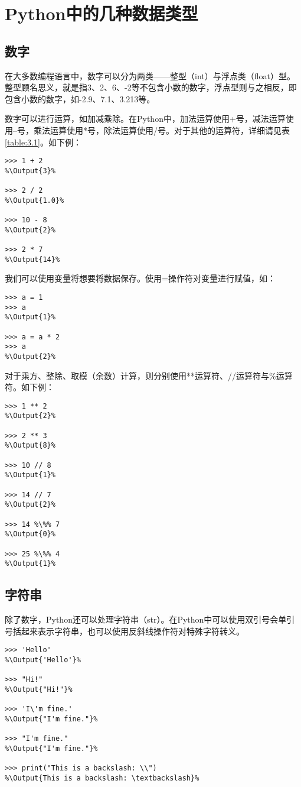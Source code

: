 \section{Python中的几种数据类型}
\subsection{数字}
在大多数编程语言中，数字可以分为两类——整型（int）与浮点类（float）型。整型顾名思义，就是指3、2、6、-2等不包含小数的数字，浮点型则与之相反，即包含小数的数字，如-2.9、7.1、3.213等。

数字可以进行运算，如加减乘除。在Python中，加法运算使用+号，减法运算使用--号，乘法运算使用*号，除法运算使用/号。对于其他的运算符，详细请见表\ref{table:3.1}。如下例：
\begin{lstlisting}
>>> 1 + 2
%\Output{3}%

>>> 2 / 2
%\Output{1.0}%

>>> 10 - 8
%\Output{2}%

>>> 2 * 7
%\Output{14}%
\end{lstlisting}

\begin{ExtraKnowledge}
    我们可以使用变量将想要将数据保存。使用=操作符对变量进行赋值，如：
    \begin{lstlisting}[numbers=none]
>>> a = 1
>>> a
%\Output{1}%

>>> a = a * 2
>>> a
%\Output{2}%
    \end{lstlisting}
\end{ExtraKnowledge}

对于乘方、整除、取模（余数）计算，则分别使用**运算符、//运算符与\%运算符。如下例：
\begin{lstlisting}
>>> 1 ** 2
%\Output{2}%

>>> 2 ** 3
%\Output{8}%

>>> 10 // 8
%\Output{1}%

>>> 14 // 7
%\Output{2}%

>>> 14 %\%% 7
%\Output{0}%

>>> 25 %\%% 4
%\Output{1}%
\end{lstlisting}

\subsection{字符串}
除了数字，Python还可以处理字符串（str）。在Python中可以使用双引号会单引号括起来表示字符串，也可以使用反斜线操作符对特殊字符转义。

\begin{lstlisting}
>>> 'Hello'
%\Output{'Hello'}%

>>> "Hi!"
%\Output{"Hi!"}%

>>> 'I\'m fine.'
%\Output{"I'm fine."}%

>>> "I'm fine."
%\Output{"I'm fine."}%

>>> print("This is a backslash: \\")
%\Output{This is a backslash: \textbackslash}%

\end{lstlisting}

